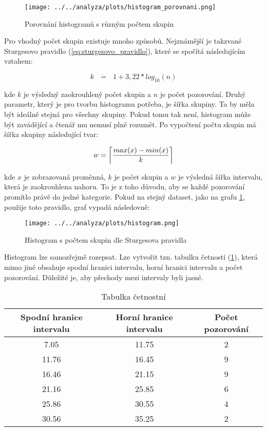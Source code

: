 \begin{figure}[H]
    \centering
    \texttt{[image: ../../analyza/plots/histogram\_porovnani.png]}
    \caption{Porovnání histogramů s různým počtem skupin} 
    \label{fig:histogram_porovnani}
\end{figure}

Pro vhodný počet skupin existuje mnoho způsobů. Nejznámější je takzvané Sturgesovo pravidlo (\ref{eq:sturgesovo_pravidlo}), které se spočítá následujícím vztahem:

\begin{equation}
    \label{eq:sturgesovo_pravidlo}
    k \text{ } \dot{\mathbf{=}} \text{ } 1 + 3,22 * log_{10}(n)
\end{equation}

kde $k$ je výsledný zaokrouhlený počet skupin a $n$ je počet pozorování. Druhý parametr, který je pro tvorbu histogramu potřeba, je šířka skupiny.
Ta by měla být ideálně stejná pro všechny skupiny. Pokud tomu tak není, histogram může být zavádějící a čtenář mu nemusí plně rozumět.
Po vypočtení počtu skupin má šířka skupiny následující tvar:

\begin{equation}
    \label{eq:sirka_histogramu}
    w = \ceil[\bigg]{ \frac{max(x) - min(x)}{k} }
\end{equation}

kde $x$ je zobrazovaná proměnná, $k$ je počet skupin a $w$ je výsledná šířka intervalu, která je zaokrouhlena nahoru. To je z toho důvodu, aby se
každé pozorování promítlo právě do jedné kategorie. Pokud na stejný dataset, jako na grafu \ref{fig:histogram_porovnani}, použije toto pravidlo,
graf vypadá následovně:

\begin{figure}[H]
    \centering
    \texttt{[image: ../../analyza/plots/histogram.png]}
    \caption{Histogram s počtem skupin dle Sturgesova pravidla} 
    \label{fig:histogram_sturges}
\end{figure}

Histogram lze samozřejmě rozepsat. Lze vytvořit tzn. tabulku četností (\ref{tab:tabulka_cetnosti_sturges}),
která mimo jiné obsahuje spodní hranici intervalu, horní hranici intervalu a počet pozorování. Důležité je,
aby přechody mezi intervaly byli jasné.

\begin{table}[H]
    \centering
    \begin{tabular}[t]{c|c|c}
        \hline
        Spodní hranice intervalu & Horní hranice intervalu & Počet pozorování \\
        \hline
         7.05 & 11.75 & 2\\
        \hline
        11.76 & 16.45 & 9\\
        \hline
        16.46 & 21.15 & 9\\
        \hline
        21.16 & 25.85 & 6\\
        \hline
        25.86 & 30.55 & 4\\
        \hline
        30.56 & 35.25 & 2\\
        \hline
    \end{tabular}
    \caption{Tabulka četnostní}
    \label{tab:tabulka_cetnosti_sturges}
\end{table}

